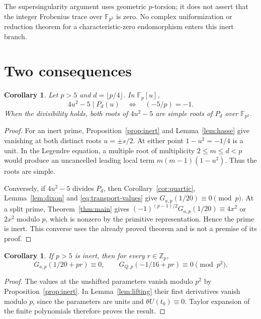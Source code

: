 \documentclass[11pt,a4paper]{article}
\newtheorem{corollary}[theorem]{Corollary}
\theoremstyle{remark}
\newcommand{\Fp}{\mathbb F_p}
\newcommand{\Fpp}{\mathbb F_{p^2}}
\newcommand{\Zp}{\mathbb Z_p}
\begin{document}
The supersingularity argument uses geometric $p$-torsion; it does not
assert that the integer Frobenius trace over $\Fpp$ is zero.
No complex uniformization or reduction theorem for a characteristic-zero
endomorphism enters this inert branch.

\section{Two consequences}\label{sec:consequences}
\begin{corollary}\label{cor:factor}
Let $p>5$ and $d=\lfloor p/4\rfloor$. In $\Fp[u]$,
\[
 4u^2-5\mid P_d(u)\quad\Longleftrightarrow\quad(-5/p)=-1.
\]
When the divisibility holds, both roots of $4u^2-5$ are simple roots
of $P_d$ over $\Fpp$.
\end{corollary}
\begin{proof}
For an inert prime, Proposition~\ref{prop:inert} and
Lemma~\ref{lem:hasse} give vanishing at both distinct roots
$u=\pm s/2$. At either point $1-u^2=-1/4$ is a unit.
In the Legendre equation, a multiple root of multiplicity
$2\le m\le d<p$ would produce an uncancelled leading local term
$m(m-1)(1-u^2)$. Thus the roots are simple.

Conversely, if $4u^2-5$ divides $P_d$, then
Corollary~\ref{cor:quartic}, Lemma~\ref{lem:dixon} and
\eqref{eq:transport-values} give
$G_{a,p}(1/20)\equiv0\pmod p$. At a split prime,
Theorem~\ref{thm:main} gives $(-1)^{(p-1)/2} G_{a,p}(1/20)\equiv4x^2$ or $2x^2$
modulo $p$, which is nonzero by the primitive representation.
Hence the prime is inert. This converse uses the already proved
theorem and is not a premise of its proof.
\end{proof}

\begin{corollary}\label{cor:stability}
If $p>5$ is inert, then for every $r\in\Zp$,
\[
 G_{a,p}(1/20+pr)\equiv0,\qquad
 G_{Q,p}(-1/16+pr)\equiv0\pmod{p^2}.
\]
\end{corollary}
\begin{proof}
The values at the unshifted parameters vanish modulo $p^2$ by
Proposition~\ref{prop:inert}. In Lemma~\ref{lem:lifting} their first
derivatives vanish modulo $p$, since the parameters are units and
$\theta U(t_0)\equiv0$. Taylor expansion of the finite polynomials
therefore proves the result.
\end{proof}

\appendix
\end{document}
